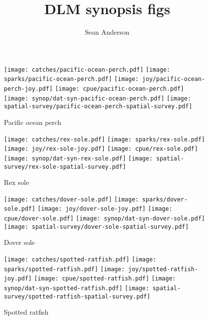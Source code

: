 \documentclass[12pt]{article}
\title{DLM synopsis figs}
\author{Sean Anderson}
\begin{document}

\begin{landscape}

\begin{figure}[htbp]
  \centering
    \texttt{[image: catches/pacific-ocean-perch.pdf]}
    \texttt{[image: sparks/pacific-ocean-perch.pdf]}
    \texttt{[image: joy/pacific-ocean-perch-joy.pdf]}
  \texttt{[image: cpue/pacific-ocean-perch.pdf]}
    \texttt{[image: synop/dat-syn-pacific-ocean-perch.pdf]}
  \texttt{[image: spatial-survey/pacific-ocean-perch-spatial-survey.pdf]}
    \caption{Pacific ocean perch}
\end{figure}

\clearpage 

\begin{figure}[htbp]
  \centering
    \texttt{[image: catches/rex-sole.pdf]}
    \texttt{[image: sparks/rex-sole.pdf]}
    \texttt{[image: joy/rex-sole-joy.pdf]}
  \texttt{[image: cpue/rex-sole.pdf]}
    \texttt{[image: synop/dat-syn-rex-sole.pdf]}
  \texttt{[image: spatial-survey/rex-sole-spatial-survey.pdf]}
    \caption{Rex sole}
\end{figure}

\clearpage 

\begin{figure}[htbp]
  \centering
    \texttt{[image: catches/dover-sole.pdf]}
    \texttt{[image: sparks/dover-sole.pdf]}
    \texttt{[image: joy/dover-sole-joy.pdf]}
  \texttt{[image: cpue/dover-sole.pdf]}
    \texttt{[image: synop/dat-syn-dover-sole.pdf]}
  \texttt{[image: spatial-survey/dover-sole-spatial-survey.pdf]}
    \caption{Dover sole}
\end{figure}

\begin{figure}[htbp]
  \centering
    \texttt{[image: catches/spotted-ratfish.pdf]}
    \texttt{[image: sparks/spotted-ratfish.pdf]}
    \texttt{[image: joy/spotted-ratfish-joy.pdf]}
  \texttt{[image: cpue/spotted-ratfish.pdf]}
    \texttt{[image: synop/dat-syn-spotted-ratfish.pdf]}
  \texttt{[image: spatial-survey/spotted-ratfish-spatial-survey.pdf]}
    \caption{Spotted ratfish}
\end{figure}


\end{landscape}
\end{document}
